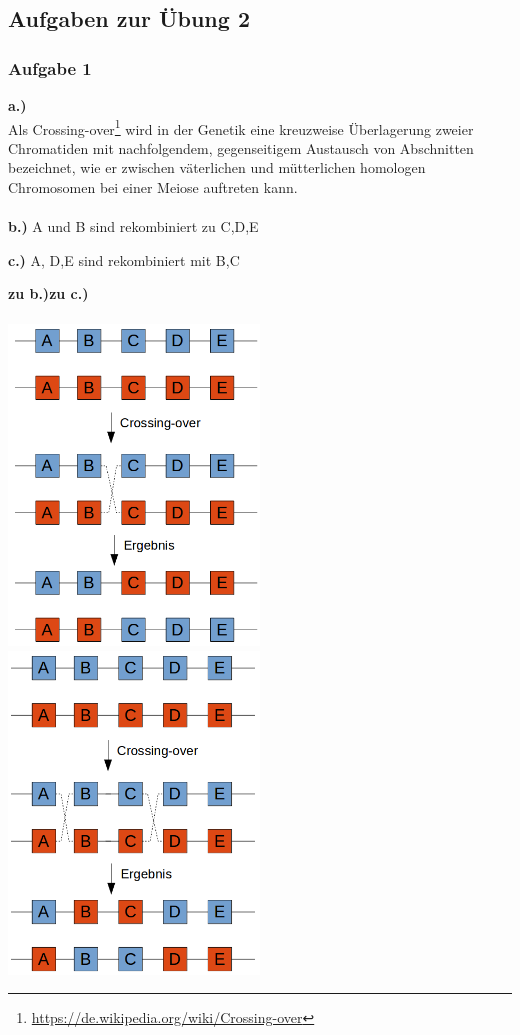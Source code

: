 \subsection{Aufgaben zur Übung 2}
\subsubsection{Aufgabe 1}
\textbf{a.)}\\
Als Crossing-over\footnote{\url{https://de.wikipedia.org/wiki/Crossing-over}} wird in der Genetik eine kreuzweise Überlagerung zweier Chromatiden mit nachfolgendem, gegenseitigem Austausch von Abschnitten bezeichnet, wie er zwischen väterlichen und mütterlichen homologen Chromosomen bei einer Meiose auftreten kann.
\\\\

\textbf{b.)} A und B sind rekombiniert zu C,D,E

\textbf{c.)} A, D,E sind rekombiniert mit B,C

\textbf{zu b.)}\hspace*{65mm}\textbf{zu c.)}\\\\
\includegraphics[width=0.5\textwidth]{lectures/V2/pix/crossing_over_b.png}
\includegraphics[width=0.5\textwidth]{lectures/V2/pix/crossing_over_c.png}

